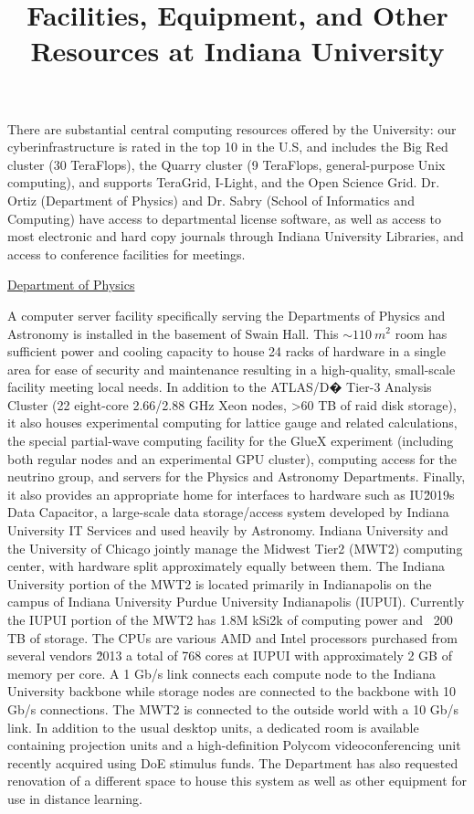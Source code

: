 \documentclass[11pt]{article}
\begin{document}
\title{Facilities, Equipment, and Other Resources at Indiana University}
\author{}
\date{}
\maketitle


\noindent There are substantial central computing resources offered by
the University: our cyberinfrastructure is rated in the top 10 in the
U.S, and includes the Big Red cluster (30 TeraFlops), the Quarry
cluster (9 TeraFlops, general-purpose Unix computing), and supports
TeraGrid, I-Light, and the Open Science Grid. Dr. Ortiz (Department of
Physics) and Dr. Sabry (School of Informatics and Computing) have
access to departmental license software, as well as access to most
electronic and hard copy journals through Indiana University
Libraries, and access to conference facilities for meetings.

\bigskip
\centerline{\Large{\underline{Department of Physics}}}
\bigskip

\noindent A computer server facility specifically serving the Departments of
Physics and Astronomy is installed in the basement of Swain Hall. This $\sim
110~m^2$ room has sufficient power and cooling capacity to house 24 racks of
hardware in a single area for ease of security and maintenance resulting in a
high-quality, small-scale facility meeting local needs. In addition to the
ATLAS/D� Tier-3 Analysis Cluster (22 eight-core 2.66/2.88 GHz Xeon nodes, >60
TB of raid disk storage), it also houses experimental computing for lattice
gauge and related calculations, the special partial-wave computing facility
for the GlueX experiment (including both regular nodes and an experimental
GPU cluster), computing access for the neutrino group, and servers for the
Physics and Astronomy Departments. Finally, it also provides an appropriate
home for interfaces to hardware such as IU\u2019s Data Capacitor, a
large-scale data storage/access system developed by Indiana University IT
Services and used heavily by Astronomy.  Indiana University and the
University of Chicago jointly manage the Midwest Tier2 (MWT2) computing
center, with hardware split approximately equally between them. The Indiana
University portion of the MWT2 is located primarily in Indianapolis on the
campus of Indiana University Purdue University Indianapolis
(IUPUI). Currently the IUPUI portion of the MWT2 has 1.8M kSi2k of computing
power and ~200 TB of storage. The CPUs are various AMD and Intel processors
purchased from several vendors \u2013 a total of 768 cores at IUPUI with
approximately 2 GB of memory per core. A 1 Gb/s link connects each compute
node to the Indiana University backbone while storage nodes are connected to
the backbone with 10 Gb/s connections. The MWT2 is connected to the outside
world with a 10 Gb/s link.  In addition to the usual desktop units, a
dedicated room is available containing projection units and a high-definition
Polycom videoconferencing unit recently acquired using DoE stimulus
funds. The Department has also requested renovation of a different space to
house this system as well as other equipment for use in distance learning.
\end{document}
